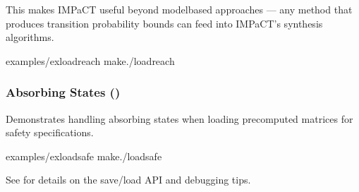\documentclass[a4paper,10pt,english]{sphinxmanual}
\begin{document}
\sphinxAtStartPar
This makes IMPaCT useful beyond model\sphinxhyphen{}based approaches — any method that produces
transition probability bounds can feed into IMPaCT’s synthesis algorithms.

\sphinxAtStartPar
{}

\begin{sphinxVerbatim}[commandchars=\\\{\}]
examples/ex\PYGZus{}load\PYGZus{}reach
make./load\PYGZus{}reach
\end{sphinxVerbatim}


\subsubsection{Absorbing States ()}
\label{\detokenize{examples/advanced:absorbing-states-ex-load-safe}}
\sphinxAtStartPar
Demonstrates handling absorbing states when loading pre\sphinxhyphen{}computed matrices for
safety specifications.

\sphinxAtStartPar
{}

\begin{sphinxVerbatim}[commandchars=\\\{\}]
examples/ex\PYGZus{}load\PYGZus{}safe
make./load\PYGZus{}safe
\end{sphinxVerbatim}

\sphinxAtStartPar
See {\hyperref[\detokenize{user-guide/io::doc}]{}} for details on the save/load API and debugging tips.
\end{document}
